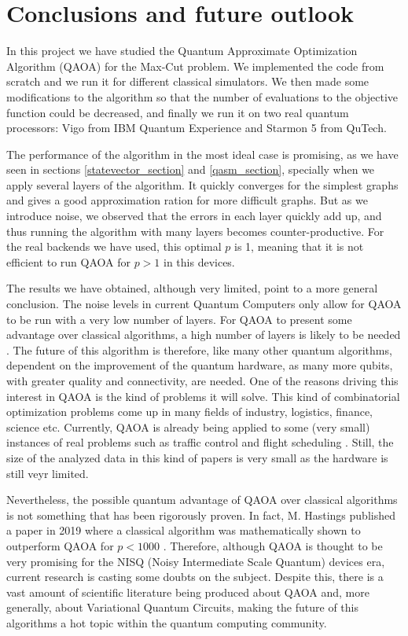 
\section{Conclusions and future outlook}
In this project we have studied the Quantum Approximate Optimization Algorithm (QAOA) for the Max-Cut problem. We implemented the code from scratch and we run it for different classical simulators. We then made some modifications to the algorithm so that the number of evaluations to the objective function could be decreased, and finally we run it on two real quantum processors: Vigo from IBM Quantum Experience and Starmon 5 from QuTech. 

The performance of the algorithm in the most ideal case is promising, as we have seen in sections \ref{statevector_section} and \ref{qasm_section}, specially when we apply several layers of the algorithm. It quickly converges for the simplest graphs and gives a good approximation ration for more difficult graphs. But as we introduce noise, we observed that the errors in each layer quickly add up, and thus running the algorithm with many layers becomes counter-productive. For the real backends we have used, this optimal $p$ is 1, meaning that it is not efficient to run QAOA for $p>1$ in this devices. 

The results we have obtained, although very limited, point to a more general conclusion. The noise levels in current Quantum Computers only allow for QAOA to be run with a very low number of layers. For QAOA to present some advantage over classical algorithms, a high number of layers is likely to be needed \cite{Guerreschi_2019}. The future of this algorithm is therefore, like many other quantum algorithms, dependent on the improvement of the quantum hardware, as many more qubits, with greater quality and connectivity, are needed. One of the reasons driving this interest in QAOA is the kind of problems it will solve. This kind of combinatorial optimization problems come up in many fields of industry, logistics, finance, science etc. Currently, QAOA is already being applied to some (very small) instances of real problems such as traffic control \cite{zhang2020qed} and flight scheduling \cite{Vikst_l_2020}. Still, the size of the analyzed data in this kind of papers is very small as the hardware is still veyr limited.

Nevertheless, the possible quantum advantage of QAOA over classical algorithms is not something that has been rigorously proven. In fact, M. Hastings published a paper in 2019 where a classical algorithm was mathematically shown to outperform QAOA for $p<1000$ \cite{hastings2019classical}. Therefore, although QAOA is thought to be very promising for the NISQ (Noisy Intermediate Scale Quantum) devices era, current research is casting some doubts on the subject. Despite this, there is a vast amount of scientific literature being produced about QAOA and, more generally, about Variational Quantum Circuits, making the future of this algorithms a hot topic within the quantum computing community. 

